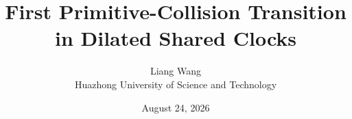 \documentclass[11pt,a4paper]{article}
\title{First Primitive-Collision Transition in Dilated Shared Clocks}
\author{Liang Wang\\
Huazhong University of Science and Technology}
\date{August 24, 2026}
\theoremstyle{definition}
\theoremstyle{remark}
\newcommand{\1}{\mathbf 1}
\begin{document}
\maketitle

\begin{abstract}

\end{abstract}











\appendix

\end{document}
